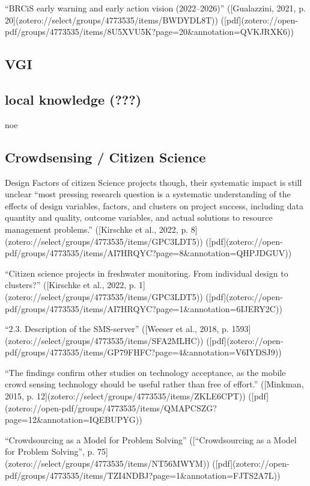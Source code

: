 {“BRCiS early warning and early action vision (2022–2026)” ([Gualazzini, 2021, p. 20](zotero://select/groups/4773535/items/BWDYDL8T)) ([pdf](zotero://open-pdf/groups/4773535/items/8U5XVU5K?page=20&annotation=QVKJRXK6))


\subsection{VGI}



\subsection{local knowledge (???)}
noe

\subsection{Crowdsensing / Citizen Science}
Design Factors of citizen Science projects
though, their systematic impact is still unclear “most pressing research question is a systematic understanding of the effects of design variables, factors, and clusters on project success, including data quantity and quality, outcome variables, and actual solutions to resource management problems.” ([Kirschke et al., 2022, p. 8](zotero://select/groups/4773535/items/GPC3LDT5)) ([pdf](zotero://open-pdf/groups/4773535/items/AI7HRQYC?page=8&annotation=QHPJDGUV))

“Citizen science projects in freshwater monitoring. From individual design to clusters?” ([Kirschke et al., 2022, p. 1](zotero://select/groups/4773535/items/GPC3LDT5)) ([pdf](zotero://open-pdf/groups/4773535/items/AI7HRQYC?page=1&annotation=6IJERY2C))

“2.3. Description of the SMS-server” ([Weeser et al., 2018, p. 1593](zotero://select/groups/4773535/items/SFA2MLHC)) ([pdf](zotero://open-pdf/groups/4773535/items/GP79FHFC?page=4&annotation=V6IYDSJ9))

“The findings confirm other studies on technology acceptance, as the mobile crowd sensing technology should be useful rather than free of effort.” ([Minkman, 2015, p. 12](zotero://select/groups/4773535/items/ZKLE6CPT)) ([pdf](zotero://open-pdf/groups/4773535/items/QMAPCSZG?page=12&annotation=IQEBUPYG))


“Crowdsourcing as a Model for Problem Solving” ([“Crowdsourcing as a Model for Problem Solving”, p. 75](zotero://select/groups/4773535/items/NT56MWYM)) ([pdf](zotero://open-pdf/groups/4773535/items/TZI4NDBJ?page=1&annotation=FJTS2A7L))

}
